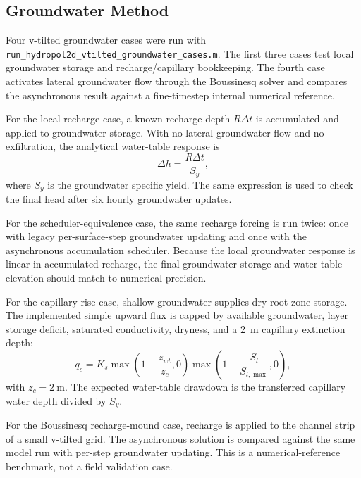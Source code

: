 \documentclass[11pt]{article}
\begin{document}
\subsection{Groundwater Method}
\label{sec:groundwater-method}
Four v-tilted groundwater cases were run with \texttt{run\_hydropol2d\_vtilted\_groundwater\_cases.m}. The first three cases test local groundwater storage and recharge/capillary bookkeeping. The fourth case activates lateral groundwater flow through the Boussinesq solver and compares the asynchronous result against a fine-timestep internal numerical reference.

For the local recharge case, a known recharge depth $R\Delta t$ is accumulated and applied to groundwater storage. With no lateral groundwater flow and no exfiltration, the analytical water-table response is
\begin{equation}
\Delta h = \frac{R \Delta t}{S_y},
\end{equation}
where $S_y$ is the groundwater specific yield. The same expression is used to check the final head after six hourly groundwater updates.

For the scheduler-equivalence case, the same recharge forcing is run twice: once with legacy per-surface-step groundwater updating and once with the asynchronous accumulation scheduler. Because the local groundwater response is linear in accumulated recharge, the final groundwater storage and water-table elevation should match to numerical precision.

For the capillary-rise case, shallow groundwater supplies dry root-zone storage. The implemented simple upward flux is capped by available groundwater, layer storage deficit, saturated conductivity, dryness, and a \SI{2}{\meter} capillary extinction depth:
\begin{equation}
q_c = K_s
\max\left(1-\frac{z_{wt}}{z_c},0\right)
\max\left(1-\frac{S_l}{S_{l,\max}},0\right),
\end{equation}
with $z_c=\SI{2}{\meter}$. The expected water-table drawdown is the transferred capillary water depth divided by $S_y$.

For the Boussinesq recharge-mound case, recharge is applied to the channel strip of a small v-tilted grid. The asynchronous solution is compared against the same model run with per-step groundwater updating. This is a numerical-reference benchmark, not a field validation case.
\end{document}

